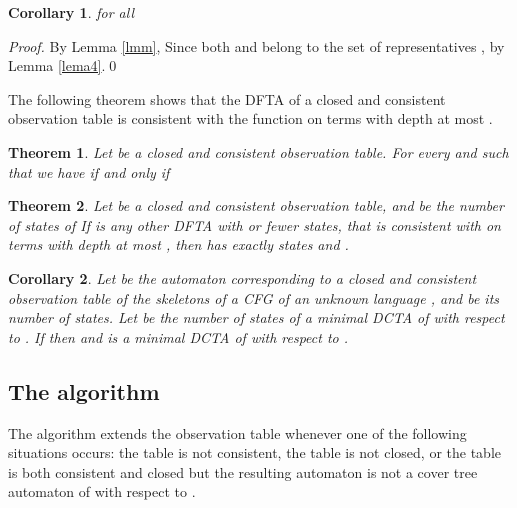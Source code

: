 \documentclass[preprint,12pt,english]{article}
\newtheorem{corollary}{Corollary}
\newtheorem{theorem}{Theorem}
\begin{document}
\begin{corollary}
\label{cor1}
 for all 
\end{corollary}
\begin{proof}
By Lemma \ref{lmm},  Since both  and  belong to the set of representatives ,   by Lemma \ref{lema4}.\qed
\end{proof}
The following theorem shows that the DFTA of a closed and consistent observation table is consistent with the function  on terms with depth at most .
\begin{theorem}
\label{thm1}
Let  be a closed and consistent observation table. For every  and  such that  we have  if and only if 
\end{theorem}

\begin{theorem}
\label{oops}
Let  be a closed and consistent observation table, and  be the number of states of  If  is any other DFTA with  or fewer states, that is consistent with  on terms with depth at most , then  has exactly  states and . 
\end{theorem}

\begin{corollary}
\label{cor2}
Let  be the automaton corresponding to a closed and consistent observation table  of the skeletons of a CFG  of an unknown language , and  be its number of states. Let  be the number of states of a minimal DCTA of  with respect to . If  then  and  is a minimal DCTA of  with respect to .
\end{corollary}
\subsection*{The  algorithm}
The algorithm  extends the observation table  whenever one of the following situations occurs: the table is not consistent, the table is not closed, or the table is both consistent and closed but the resulting automaton   is not a cover tree automaton of  with respect to .
\end{document}
